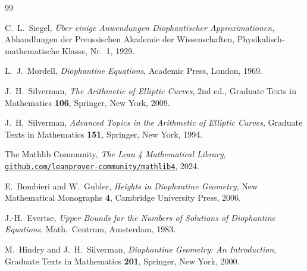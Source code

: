 \documentclass[12pt,a4paper]{article}
\theoremstyle{definition}
\begin{document}
\begin{thebibliography}{99}

  C.~L.~Siegel,
  \textit{\"Uber einige Anwendungen Diophantischer Approximationen},
  Abhandlungen der Preussischen Akademie der Wissenschaften,
  Physikalisch-mathematische Klasse, Nr.~1, 1929.

  L.~J.~Mordell,
  \textit{Diophantine Equations},
  Academic Press, London, 1969.

  J.~H.~Silverman,
  \textit{The Arithmetic of Elliptic Curves},
  2nd ed., Graduate Texts in Mathematics \textbf{106},
  Springer, New York, 2009.

  J.~H.~Silverman,
  \textit{Advanced Topics in the Arithmetic of Elliptic Curves},
  Graduate Texts in Mathematics \textbf{151},
  Springer, New York, 1994.

  The Mathlib Community,
  \textit{The Lean 4 Mathematical Library},
  \texttt{\href{https://github.com/leanprover-community/mathlib4}{github.com/leanprover-community/mathlib4}},
  2024.

  E.~Bombieri and W.~Gubler,
  \textit{Heights in Diophantine Geometry},
  New Mathematical Monographs \textbf{4},
  Cambridge University Press, 2006.

  J.-H.~Evertse,
  \textit{Upper Bounds for the Numbers of Solutions of Diophantine Equations},
  Math.\ Centrum, Amsterdam, 1983.

  M.~Hindry and J.~H.~Silverman,
  \textit{Diophantine Geometry: An Introduction},
  Graduate Texts in Mathematics \textbf{201},
  Springer, New York, 2000.

\end{thebibliography}
\end{document}
